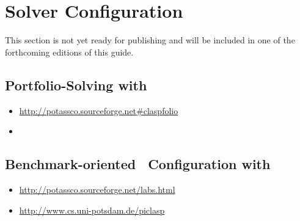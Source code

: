 
\section{Solver Configuration}
\label{sec:configuration}

This section is not yet ready for publishing
and will be included in one of the forthcoming editions of this guide.

\subsection{Portfolio-Solving with \claspfolio}
\label{sec:claspfolio}

\begin{itemize}
\item \url{http://potassco.sourceforge.net#claspfolio}
\item \cite{holisc14a}
\end{itemize}

\subsection{Benchmark-oriented \clasp\ Configuration with \piclasp}
\label{sec:piclasp}

\begin{itemize}
\item \url{http://potassco.sourceforge.net/labs.html}
\item \url{http://www.cs.uni-potsdam.de/piclasp}
\end{itemize}


